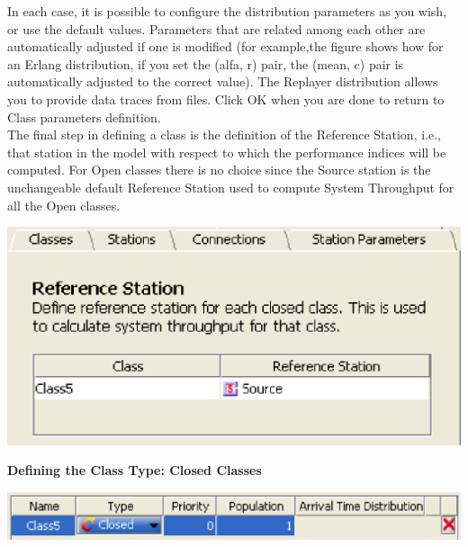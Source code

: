 In each case, it is possible to configure the distribution parameters as you wish, or use the default values. Parameters that are related among each other are automatically adjusted if one is modified (for example,the figure shows how for an Erlang distribution, if you set the (alfa, r) pair, the (mean, c) pair is automatically adjusted to the correct value).
The Replayer distribution allows you to provide data traces from files.
Click OK when you are done to return to Class parameters definition.\\
The final step in defining a class is the definition of the Reference Station, i.e., that station in the model with respect to which the performance indices will be computed. For Open classes there is no choice since the Source station is the unchangeable default Reference Station used to compute System Throughput for all the Open classes.\\
\begin{center}
\includegraphics[scale=.5]{img/jsim/reference_open1.eps}
\end{center}

\textbf{\large{Defining the Class Type: Closed Classes}}\\
\begin{center}
\includegraphics[scale=.5]{img/jsim/closed_class1.eps}
\end{center}

